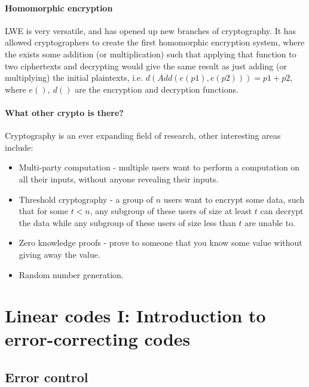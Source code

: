 \documentclass[a4paper, 11pt, openany]{book}
\begin{document}
\paragraph{Homomorphic encryption} LWE is very versatile, and has opened up new branches of cryptography. It has allowed cryptographers to create the first homomorphic encryption system, where the exists some addition (or multiplication) such that applying that function to two ciphertexts and decrypting would give the same result as just adding (or multiplying) the initial plaintexts, i.e. $d(Add(e(p1),e(p2))) = p1 + p2$, where $e(),~d()$ are the encryption and decryption functions.

\paragraph{What other crypto is there?} Cryptography is an ever expanding field of research, other interesting areas include:
\begin{itemize}
	\item Multi-party computation - multiple users want to perform a computation on all their inputs, without anyone revealing their inputs.
	\item Threshold cryptography - a group of $n$ users want to encrypt some data, such that for some $t<n$, any subgroup of these users of size at least $t$ can decrypt the data while any subgroup of these users of size less than $t$ are unable to.
	\item Zero knowledge proofs - prove to someone that you know some value without giving away the value.
	\item Random number generation.
\end{itemize}



\section{Linear codes I: Introduction to error-correcting codes}
\label{sec:21}



\subsection{Error control}
\end{document}
